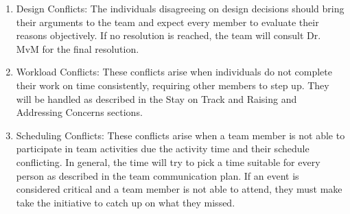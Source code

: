 \documentclass{article}
\begin{document}
\begin{enumerate}
  \item Design Conflicts: The individuals disagreeing on design decisions
  should bring their arguments to the team and expect every member to evaluate
  their reasons objectively. If no resolution is reached, the team will consult 
  Dr. MvM for the final resolution. 

  \item Workload Conflicts: These conflicts arise when individuals do not
  complete their work on time consistently, requiring other members to step up. 
  They will be handled as described in the Stay on Track and Raising and
  Addressing Concerns sections.

  \item Scheduling Conflicts: These conflicts arise when a team member is not
  able to participate in team activities due the activity time and their schedule
  conflicting. In general, the time will try to pick a time suitable for every person
  as described in the team communication plan. 
  If an event is considered critical and a team member is not able to attend, they 
  must make take the initiative to catch up on what they missed. 
\end{enumerate}
\end{document}
